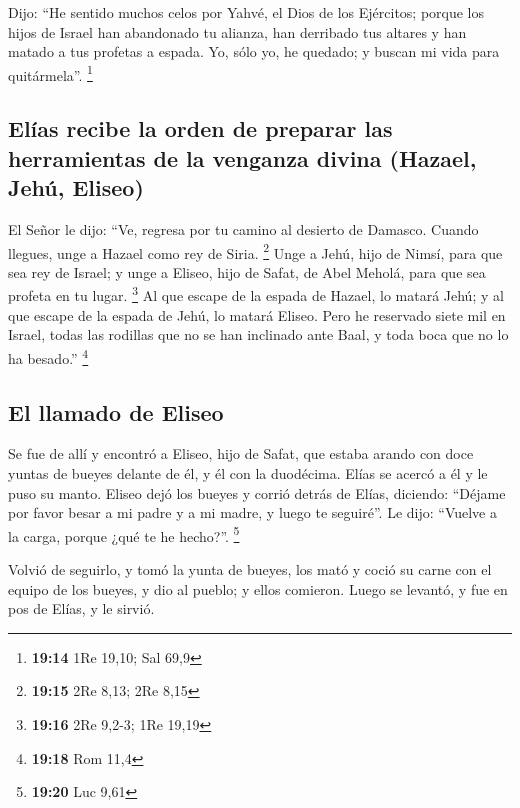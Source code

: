  Dijo: ``He sentido muchos celos por Yahvé, el Dios de
los Ejércitos; porque los hijos de Israel han abandonado tu alianza, han
derribado tus altares y han matado a tus profetas a espada. Yo, sólo yo,
he quedado; y buscan mi vida para quitármela''. \footnote{\textbf{19:14}
  1Re 19,10; Sal 69,9}

\hypertarget{eluxedas-recibe-la-orden-de-preparar-las-herramientas-de-la-venganza-divina-hazael-jehuxfa-eliseo}{%
\subsection{Elías recibe la orden de preparar las herramientas de la
venganza divina (Hazael, Jehú,
Eliseo)}\label{eluxedas-recibe-la-orden-de-preparar-las-herramientas-de-la-venganza-divina-hazael-jehuxfa-eliseo}}

 El Señor le dijo: ``Ve, regresa por tu camino al
desierto de Damasco. Cuando llegues, unge a Hazael como rey de Siria.
\footnote{\textbf{19:15} 2Re 8,13; 2Re 8,15}  Unge a
Jehú, hijo de Nimsí, para que sea rey de Israel; y unge a Eliseo, hijo
de Safat, de Abel Meholá, para que sea profeta en tu lugar. \footnote{\textbf{19:16}
  2Re 9,2-3; 1Re 19,19}  Al que escape de la espada de
Hazael, lo matará Jehú; y al que escape de la espada de Jehú, lo matará
Eliseo.  Pero he reservado siete mil en Israel, todas las
rodillas que no se han inclinado ante Baal, y toda boca que no lo ha
besado.'' \footnote{\textbf{19:18} Rom 11,4}

\hypertarget{el-llamado-de-eliseo}{%
\subsection{El llamado de Eliseo}\label{el-llamado-de-eliseo}}

 Se fue de allí y encontró a Eliseo, hijo de Safat, que
estaba arando con doce yuntas de bueyes delante de él, y él con la
duodécima. Elías se acercó a él y le puso su manto. 
Eliseo dejó los bueyes y corrió detrás de Elías, diciendo: ``Déjame por
favor besar a mi padre y a mi madre, y luego te seguiré''. Le dijo:
``Vuelve a la carga, porque ¿qué te he hecho?''. \footnote{\textbf{19:20}
  Luc 9,61}

 Volvió de seguirlo, y tomó la yunta de bueyes, los mató
y coció su carne con el equipo de los bueyes, y dio al pueblo; y ellos
comieron. Luego se levantó, y fue en pos de Elías, y le sirvió.

